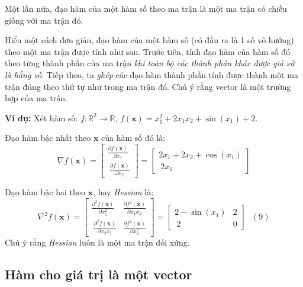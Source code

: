 Một lần nữa, đạo hàm của một hàm số theo ma trận là một ma trận có chiều giống với ma trận đó. 
 
Hiểu một cách đơn giản, đạo hàm của một hàm số (có đầu ra là 1 số vô hướng) theo một ma trận được tính như sau. Trước tiên, tính đạo hàm của hàm số đó theo từng thành phần của ma trận \textit{khi toàn bộ các thành phần khác được giả sử là hằng số}. Tiếp theo, ta \textit{ghép} các đạo hàm thành phần tính được thành một ma trận đúng theo thứ tự như trong ma trận đó. Chú ý rằng vector là một trường hợp của ma trận.  
 
\textbf{Ví dụ:} Xét hàm số: $f: \mathbb{R}^2 \rightarrow \mathbb{R}$, $f(\mathbf{x}) = x_1 ^2 + 2x_1x_2 + \sin(x_1) + 2$.  
 
Đạo hàm bậc nhất theo $\mathbf{x}$ của hàm số đó là:  
\begin{equation*} 
\nabla f(\mathbf{x}) = 
\left[ 
\begin{matrix} 
    \frac{\partial f(\mathbf{x})}{\partial x_1} \\\ 
    \frac{\partial f(\mathbf{x})}{\partial x_2} 
\end{matrix} 
\right] = \left[ 
\begin{matrix} 
    2x_1 + 2x_2 + \cos(x_1) \\\ 
    2x_1 
\end{matrix} 
\right] 
\end{equation*} 
 
Đạo hàm bậc hai theo $\mathbf{x}$, hay \textit{Hessian} là:  
\begin{equation*} 
\nabla^2 f(\mathbf{x}) =  
\left[ 
\begin{matrix} 
    \frac{\partial^2 f(\mathbf{x})}{\partial x_1^2} & \frac{\partial f^2(\mathbf{x})}{\partial x_1x_2} \\\ 
    \frac{\partial^2 f(\mathbf{x})}{\partial x_2x_1} & \frac{\partial f^2(\mathbf{x})}{\partial x_2^2} 
\end{matrix} 
\right] = 
\left[ 
\begin{matrix} 
    2 - \sin(x_1) & 2 \\\ 
    2 & 0  
\end{matrix} 
\right] ~~~ (9) 
\end{equation*} 
Chú ý rằng \textit{Hessian} luôn là một ma trận đối xứng.  
 
 
 
\subsection{Hàm cho giá trị là một vector }
 
